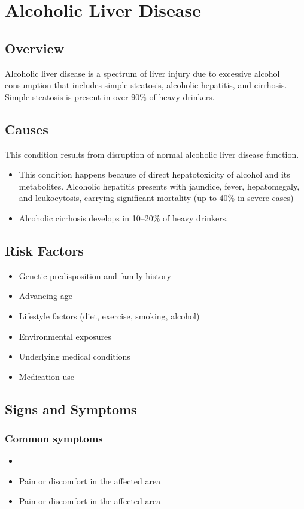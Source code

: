 \chapter{Alcoholic Liver Disease}
\label{sec:Alcoholic Liver Disease}

\section{Overview}
Alcoholic liver disease is a spectrum of liver injury due to excessive alcohol consumption that includes simple steatosis, alcoholic hepatitis, and cirrhosis. Simple steatosis is present in over 90\% of heavy drinkers.
\section{Causes}
This condition results from disruption of normal alcoholic liver disease function.

\begin{itemize}[noitemsep]
  \item This condition happens because of direct hepatotoxicity of alcohol and its metabolites. Alcoholic hepatitis presents with jaundice, fever, hepatomegaly, and leukocytosis, carrying significant mortality (up to 40\% in severe cases)
  \item Alcoholic cirrhosis develops in 10--20\% of heavy drinkers.
\end{itemize}
\section{Risk Factors}


\begin{itemize}[noitemsep]
  \item Genetic predisposition and family history
  \item Advancing age
  \item Lifestyle factors (diet, exercise, smoking, alcohol)
  \item Environmental exposures
  \item Underlying medical conditions
  \item Medication use
\end{itemize}
\section{Signs and Symptoms}

\subsection{Common symptoms}
\begin{itemize}[noitemsep]
  \item \item Pain or discomfort in the affected area    \item Pain or discomfort in the affected area
  \end{itemize}


